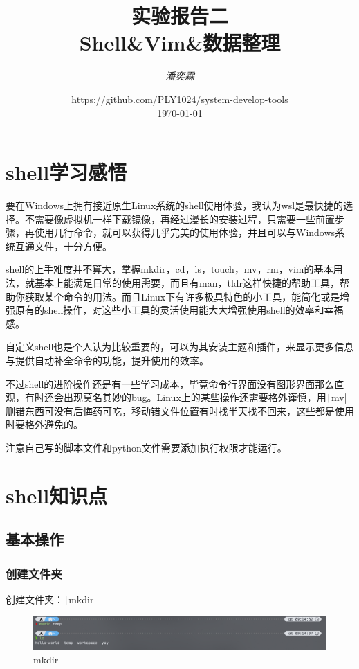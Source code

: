 \documentclass[fontset=ubuntu]{ctexart}
\title{\Huge \textbf{实验报告二 \\ Shell\&Vim\&数据整理}}
\author{\textit{潘奕霖}}
\date{https://github.com/PLY1024/system-develop-tools\\ \today}
\begin{document}
\begin{sloppypar}

\maketitle
\newpage

\tableofcontents
\newpage

\section{shell学习感悟}
要在Windows上拥有接近原生Linux系统的shell使用体验，我认为wsl是最快捷的选择。不需要像虚拟机一样下载镜像，再经过漫长的安装过程，只需要一些前置步骤，再使用几行命令，就可以获得几乎完美的使用体验，并且可以与Windows系统互通文件，十分方便。

shell的上手难度并不算大，掌握mkdir，cd，ls，touch，mv，rm，vim的基本用法，就基本上能满足日常的使用需要，而且有man，tldr这样快捷的帮助工具，帮助你获取某个命令的用法。而且Linux下有许多极具特色的小工具，能简化或是增强原有的shell操作，对这些小工具的灵活使用能大大增强使用shell的效率和幸福感。

自定义shell也是个人认为比较重要的，可以为其安装主题和插件，来显示更多信息与提供自动补全命令的功能，提升使用的效率。

不过shell的进阶操作还是有一些学习成本，毕竟命令行界面没有图形界面那么直观，有时还会出现莫名其妙的bug。Linux上的某些操作还需要格外谨慎，用\texttt|mv|删错东西可没有后悔药可吃，移动错文件位置有时找半天找不回来，这些都是使用时要格外避免的。

注意自己写的脚本文件和python文件需要添加执行权限才能运行。

\section{shell知识点}
\subsection{基本操作}
\subsubsection{创建文件夹}
创建文件夹：\texttt|mkdir|
\begin{figure}[htb]
    \centering
    \includegraphics[width=0.75\linewidth]{Mkdir.png}
    \caption{mkdir}
    \label{fig:Mkdir}
\end{figure}


\end{sloppypar}
\end{document}
